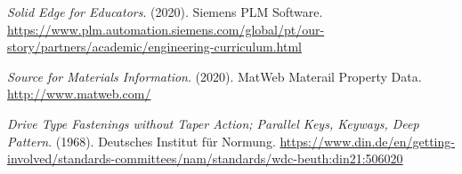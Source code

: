 \documentclass[12pt,a4paper]{article}
\begin{document}
\label{csl:28}\textit{{Solid Edge for Educators}}. (2020). Siemens PLM Software. \url{https://www.plm.automation.siemens.com/global/pt/our-story/partners/academic/engineering-curriculum.html}

\label{csl:29}\textit{{Source for Materials Information}}. (2020). MatWeb Materail Property Data. \url{http://www.matweb.com/}

\label{csl:30}\textit{{Drive Type Fastenings without Taper Action; Parallel Keys, Keyways, Deep Pattern}}. (1968). Deutsches Institut für Normung. \url{https://www.din.de/en/getting-involved/standards-committees/nam/standards/wdc-beuth:din21:506020}
\end{document}
